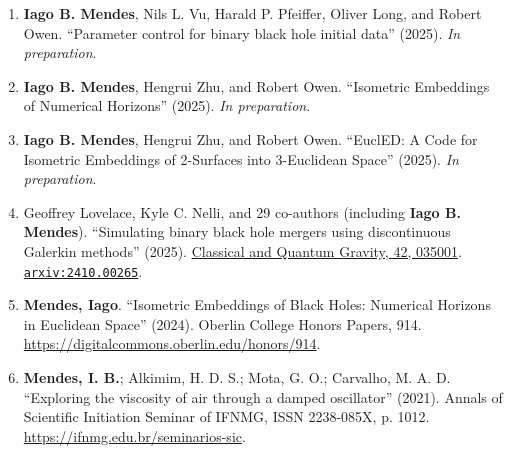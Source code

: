 \begin{enumerate} \setlength\itemsep{-0.1cm}
  \item {\bf Iago B. Mendes}, Nils L. Vu, Harald P. Pfeiffer, Oliver Long, and Robert Owen. ``Parameter control for binary black hole initial data'' (2025). {\em In preparation}.
  \item {\bf Iago B. Mendes}, Hengrui Zhu, and Robert Owen. ``Isometric Embeddings of Numerical Horizons'' (2025). {\em In preparation}.
  \item {\bf Iago B. Mendes}, Hengrui Zhu, and Robert Owen. ``EuclED: A Code for Isometric Embeddings of 2-Surfaces into 3-Euclidean Space'' (2025). {\em In preparation}.
  \item Geoffrey Lovelace, Kyle C. Nelli, and 29 co-authors (including {\bf Iago B. Mendes}). ``Simulating binary black hole mergers using discontinuous Galerkin methods'' (2025). \href{https://doi.org/10.1088/1361-6382/ad9f19}{Classical and Quantum Gravity, 42, 035001}. \href{https://arxiv.org/abs/2410.00265}{{\tt arxiv:2410.00265}}.
  \item {\bf Mendes, Iago}. “Isometric Embeddings of Black Holes: Numerical Horizons in Euclidean Space” (2024). Oberlin College Honors Papers, 914. \url{https://digitalcommons.oberlin.edu/honors/914}.
  \item {\bf Mendes, I. B.}; Alkimim, H. D. S.; Mota, G. O.; Carvalho, M. A. D. ``Exploring the viscosity of air through a damped oscillator'' (2021). Annals of Scientific Initiation Seminar of IFNMG, ISSN 2238-085X, p. 1012. \url{https://ifnmg.edu.br/seminarios-sic}.
\end{enumerate}
